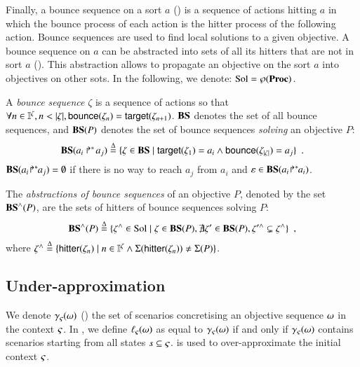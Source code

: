 Finally, a bounce sequence on a sort $a$ () is a sequence of actions hitting $a$
in which the bounce process of each action is the hitter process of the following action.
Bounce sequences are used to find local solutions to a given objective.
A bounce sequence on $a$ can be abstracted into sets of all its hitters that are not in sort $a$ ().
This abstraction allows to propagate an objective on the sort $a$ into objectives on other sots.
In the following, we denote: $\mathrm{Sol} = \wp(\mathbf{Proc})$.
\begin{definition}
\label{def:bs}
  A \emph{bounce sequence} $\zeta$ is a sequence of actions so that $\forall n \in \mathbb{I}^{\zeta}, n < |\zeta|, \mathsf{bounce}(\zeta_{n}) = \mathsf{target}(\zeta_{n+1})$.
  $\mathbf{BS}$ denotes the set of all bounce sequences, and
  $\mathbf{BS}(P)$ denotes the set of bounce sequences \emph{solving} an objective $P$:
  \[
    \mathbf{BS}(\mbox{$a_i\Rsh^*\!a_j$}) \stackrel{\Delta}= \{ \zeta \in \mathbf{BS} \mid \mathsf{target}(\zeta_1)= a_i \wedge \mathsf{bounce}(\zeta_{|\zeta|}) = a_j \} \enspace.
  \]
  $\mathbf{BS}({a_i\!\Rsh^*\!\!a_j}) = \emptyset$ if there is no way to reach $a_j$ from $a_i$ and $\varepsilon \in \mathbf{BS}({a_i\!\Rsh^*\!\!a_i})$.
\end{definition}
%
\begin{definition}[$\aBS:\Obj \rightarrow \powerset(\Sol)$]
\label{def:aBS}
  The \emph{abstractions of bounce sequences} of an objective $P$, denoted by the set $\mathbf{BS}^\wedge(P)$, are the sets of hitters of bounce sequences solving $P$:
  \[
    \mathbf{BS}^\wedge(P) \stackrel{\Delta}= \{ \zeta^\wedge \in \mathrm{Sol} \mid \zeta \in \mathbf{BS}(P), \nexists \zeta' \in \mathbf{BS}(P), \zeta'^\wedge \subsetneq \zeta^\wedge \} \enspace,
  \]
  where $\zeta^\wedge \stackrel{\Delta}= \{ \mathsf{hitter}(\zeta_n) \mid  n \in \mathbb{I}^{\zeta} \wedge \Sigma(\mathsf{hitter}(\zeta_n)) \neq \Sigma(P) \}$.
\end{definition}



\subsection{Under-approximation}
\label{ssec:ua}

We denote $\gamma_\varsigma(\omega)$ () the set of scenarios concretising an objective sequence $\omega$ in the context $\varsigma$.
In , we define $\ell_\varsigma(\omega)$ as equal to $\gamma_\varsigma(\omega)$ if and only if $\gamma_\varsigma(\omega)$ contains scenarios starting from all states $s \subseteq \varsigma$.
 is used to over-approximate the initial context $\varsigma$.

